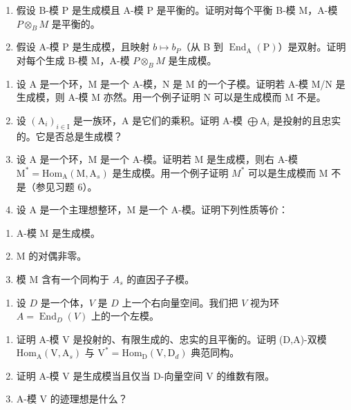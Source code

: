 \begin{enumerate}
\def\labelenumi{\alph{enumi})}
\item
  假设 B-模 P 是生成模且 A-模 P 是平衡的。证明对每个平衡 B-模 M，A-模 \(P \otimes_{B} M\) 是平衡的。
\item
  假设 A-模 P 是生成模，且映射 \(b \mapsto b_{P}\)（从 B 到 \(\operatorname{End}_{\mathrm{A}}(\mathrm{P})\)）是双射。证明对每个生成 B-模 M，A-模 \(P \otimes_{B} M\) 是生成模。
\end{enumerate}

\begin{enumerate}
\def\labelenumi{\arabic{enumi})}
\setcounter{enumi}{4}
\item
  设 A 是一个环，M 是一个 A-模，N 是 M 的一个子模。证明若 A-模 M/N 是生成模，则 A-模 M 亦然。用一个例子证明 N 可以是生成模而 M 不是。
\item
  设 \((\mathrm{A}_i)_{i\in \mathrm{I}}\) 是一族环，A 是它们的乘积。证明 A-模 \(\bigoplus \mathrm{A}_i\) 是投射的且忠实的。它是否总是生成模？
\item
  设 A 是一个环，M 是一个 A-模。证明若 M 是生成模，则右 A-模 \(\mathrm{M}^{*} = \mathrm{Hom}_{\mathrm{A}}(\mathrm{M}, \mathrm{A}_{s})\) 是生成模。用一个例子证明 \(M^{*}\) 可以是生成模而 M 不是（参见习题 6）。
\item
  设 A 是一个主理想整环，M 是一个 A-模。证明下列性质等价：
\end{enumerate}

\begin{enumerate}
\def\labelenumi{(\roman{enumi})}
\item
  A-模 M 是生成模。
\item
  M 的对偶非零。
\item
  模 M 含有一个同构于 \(A_{s}\) 的直因子子模。
\end{enumerate}

\begin{enumerate}
\def\labelenumi{\arabic{enumi})}
\setcounter{enumi}{8}
\tightlist
\item
  设 \(D\) 是一个体，\(V\) 是 \(D\) 上一个右向量空间。我们把 \(V\) 视为环 \(A = \operatorname{End}_D(V)\) 上的一个左模。
\end{enumerate}

\begin{enumerate}
\def\labelenumi{\alph{enumi})}
\item
  证明 A-模 V 是投射的、有限生成的、忠实的且平衡的。证明 (D,A)-双模 \(\mathrm{Hom}_{\mathrm{A}}(\mathrm{V},\mathrm{A}_{s})\) 与 \(\mathrm{V}^{*}=\mathrm{Hom}_{\mathrm{D}}(\mathrm{V},\mathrm{D}_{d})\) 典范同构。
\item
  证明 A-模 V 是生成模当且仅当 D-向量空间 V 的维数有限。
\item
  A-模 V 的迹理想是什么？
\end{enumerate}

